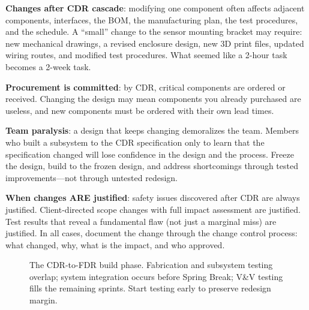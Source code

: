 \textbf{Changes after CDR cascade}: modifying one component often affects adjacent components, interfaces, the BOM, the manufacturing plan, the test procedures, and the schedule. A ``small'' change to the sensor mounting bracket may require: new mechanical drawings, a revised enclosure design, new 3D print files, updated wiring routes, and modified test procedures. What seemed like a 2-hour task becomes a 2-week task.

\textbf{Procurement is committed}: by CDR, critical components are ordered or received. Changing the design may mean components you already purchased are useless, and new components must be ordered with their own lead times.

\textbf{Team paralysis}: a design that keeps changing demoralizes the team. Members who built a subsystem to the CDR specification only to learn that the specification changed will lose confidence in the design and the process. Freeze the design, build to the frozen design, and address shortcomings through tested improvements---not through untested redesign.

\textbf{When changes ARE justified}: safety issues discovered after CDR are always justified. Client-directed scope changes with full impact assessment are justified. Test results that reveal a fundamental flaw (not just a marginal miss) are justified. In all cases, document the change through the change control process: what changed, why, what is the impact, and who approved.


\begin{figure}[htbp]
\centering
{}
\caption{The CDR-to-FDR build phase. Fabrication and subsystem testing overlap; system integration occurs before Spring Break; V\&V testing fills the remaining sprints. Start testing early to preserve redesign margin.}\label{fig:build-timeline}
\end{figure}


